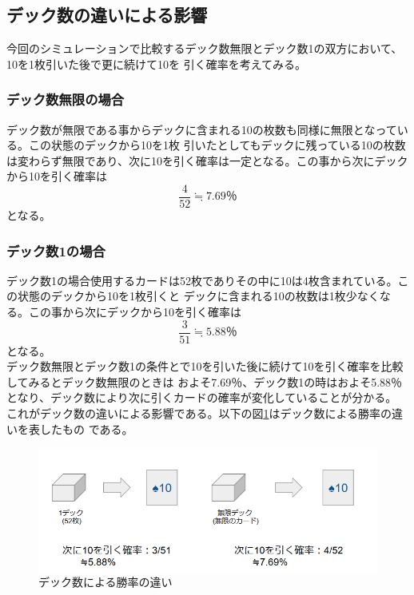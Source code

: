 
\subsection{デック数の違いによる影響}
今回のシミュレーションで比較するデック数無限とデック数1の双方において、10を1枚引いた後で更に続けて10を
引く確率を考えてみる。
\subsubsection{デック数無限の場合}
デック数が無限である事からデックに含まれる10の枚数も同様に無限となっている。この状態のデックから10を1枚
引いたとしてもデックに残っている10の枚数は変わらず無限であり、次に10を引く確率は一定となる。この事から次にデックから10を引く確率は\begin{equation}\frac{4}{52} \fallingdotseq 7.69％\end{equation}となる。\\
\subsubsection{デック数1の場合}
デック数1の場合使用するカードは52枚でありその中に10は4枚含まれている。この状態のデックから10を1枚引くと
デックに含まれる10の枚数は1枚少なくなる。この事から次にデックから10を引く確率は\begin{equation}\frac{3}{51}\fallingdotseq5.88％\end{equation}となる。\\
デック数無限とデック数1の条件とで10を引いた後に続けて10を引く確率を比較してみるとデック数無限のときは
およそ7.69％、デック数1の時はおよそ5.88％となり、デック数により次に引くカードの確率が変化していることが分かる。
これがデック数の違いによる影響である。以下の図\ref{hogehoge}はデック数による勝率の違いを表したもの
である。

\begin{figure}[H]
\begin{center}

 \includegraphics[width=0.7\linewidth]{./figure/DeckDiff.PNG}
 \caption{デック数による勝率の違い \label{hogehoge}}
\end{center}
\end{figure}

